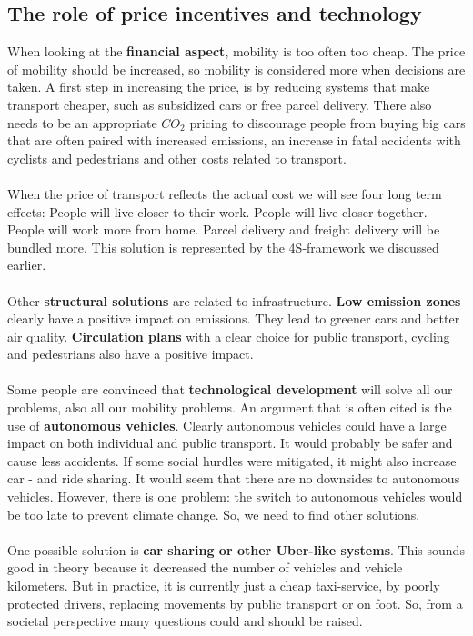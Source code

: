 \documentclass[../summary.tex]{subfiles}
\begin{document}
	\subsection{The role of price incentives and technology}
	
	When looking at the \textbf{financial aspect}, mobility is too often too cheap. The price of mobility should be increased, so mobility is considered more when decisions are taken. A first step in increasing the price, is by reducing systems that make transport cheaper, such as subsidized cars or free parcel delivery. There also needs to be an appropriate $CO_{2}$ pricing to discourage people from buying big cars that are often paired with increased emissions, an increase in fatal accidents with cyclists and pedestrians and other costs related to transport. 
	\\\\
	When the price of transport reflects the actual cost we will see four long term effects: People will live closer to their work. People will live closer together. People will work more from home. Parcel delivery and freight delivery will be bundled more. This solution is represented by the 4S-framework we discussed earlier. 
	\\\\
	Other \textbf{structural solutions} are related to infrastructure. \textbf{Low emission zones} clearly have a positive impact on emissions. They lead to greener cars and better air quality. \textbf{Circulation plans} with a clear choice for public transport, cycling and pedestrians also have a positive impact. 
	\\\\
	 Some people are convinced that \textbf{technological development} will solve all our problems, also all our mobility problems. An argument that is often  cited is the use of  \textbf{autonomous vehicles}. Clearly autonomous vehicles could have a large impact on both individual and public transport. It would probably be safer and cause less accidents. If some social hurdles were mitigated, it might also increase car - and ride sharing. It would seem that there are no downsides to autonomous vehicles. However, there is one problem: the switch to autonomous vehicles would be too late to prevent climate change. So, we need to find other solutions.
	 \\\\
	 One possible solution is \textbf{car sharing or other Uber-like systems}. This sounds good in theory because it decreased the number of vehicles 	and vehicle kilometers. But in practice, it is currently just a cheap taxi-service, by poorly protected drivers, replacing movements by public transport or on foot. So, from a societal perspective many questions could and should be raised.
\end{document}
